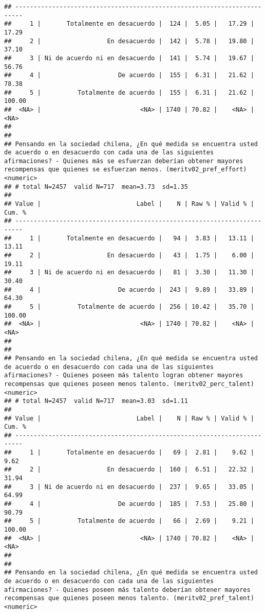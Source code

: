 \documentclass[
  10,
  landscape,
  legalpaper]{article}
\begin{document}
\begin{verbatim}
## ------------------------------------------------------------------------
##     1 |       Totalmente en desacuerdo |  124 |  5.05 |   17.29 |  17.29
##     2 |                  En desacuerdo |  142 |  5.78 |   19.80 |  37.10
##     3 | Ni de acuerdo ni en desacuerdo |  141 |  5.74 |   19.67 |  56.76
##     4 |                     De acuerdo |  155 |  6.31 |   21.62 |  78.38
##     5 |          Totalmente de acuerdo |  155 |  6.31 |   21.62 | 100.00
##  <NA> |                           <NA> | 1740 | 70.82 |    <NA> |   <NA>
## 
## 
## Pensando en la sociedad chilena, ¿En qué medida se encuentra usted de acuerdo o en desacuerdo con cada una de las siguientes afirmaciones? - Quienes más se esfuerzan deberían obtener mayores recompensas que quienes se esfuerzan menos. (meritv02_pref_effort) <numeric>
## # total N=2457  valid N=717  mean=3.73  sd=1.35
## 
## Value |                          Label |    N | Raw % | Valid % | Cum. %
## ------------------------------------------------------------------------
##     1 |       Totalmente en desacuerdo |   94 |  3.83 |   13.11 |  13.11
##     2 |                  En desacuerdo |   43 |  1.75 |    6.00 |  19.11
##     3 | Ni de acuerdo ni en desacuerdo |   81 |  3.30 |   11.30 |  30.40
##     4 |                     De acuerdo |  243 |  9.89 |   33.89 |  64.30
##     5 |          Totalmente de acuerdo |  256 | 10.42 |   35.70 | 100.00
##  <NA> |                           <NA> | 1740 | 70.82 |    <NA> |   <NA>
## 
## 
## Pensando en la sociedad chilena, ¿En qué medida se encuentra usted de acuerdo o en desacuerdo con cada una de las siguientes afirmaciones? - Quienes poseen más talento logran obtener mayores recompensas que quienes poseen menos talento. (meritv02_perc_talent) <numeric>
## # total N=2457  valid N=717  mean=3.03  sd=1.11
## 
## Value |                          Label |    N | Raw % | Valid % | Cum. %
## ------------------------------------------------------------------------
##     1 |       Totalmente en desacuerdo |   69 |  2.81 |    9.62 |   9.62
##     2 |                  En desacuerdo |  160 |  6.51 |   22.32 |  31.94
##     3 | Ni de acuerdo ni en desacuerdo |  237 |  9.65 |   33.05 |  64.99
##     4 |                     De acuerdo |  185 |  7.53 |   25.80 |  90.79
##     5 |          Totalmente de acuerdo |   66 |  2.69 |    9.21 | 100.00
##  <NA> |                           <NA> | 1740 | 70.82 |    <NA> |   <NA>
## 
## 
## Pensando en la sociedad chilena, ¿En qué medida se encuentra usted de acuerdo o en desacuerdo con cada una de las siguientes afirmaciones? - Quienes poseen más talento deberían obtener mayores recompensas que quienes poseen menos talento. (meritv02_pref_talent) <numeric>

\end{verbatim}
\end{document}

